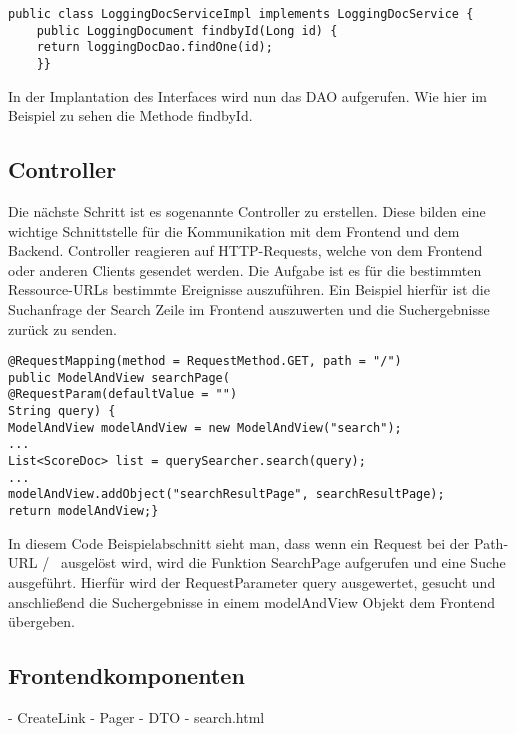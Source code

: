 \begin{lstlisting}
public class LoggingDocServiceImpl implements LoggingDocService {
	public LoggingDocument findbyId(Long id) {
	return loggingDocDao.findOne(id);
	}}
\end{lstlisting}

In der Implantation des Interfaces wird nun das DAO aufgerufen.
Wie hier im Beispiel zu sehen die Methode findbyId.

\subsection{Controller}
Die nächste Schritt ist es sogenannte Controller zu erstellen.
Diese bilden eine wichtige Schnittstelle für die Kommunikation mit dem Frontend und dem Backend.
Controller reagieren auf HTTP-Requests, welche von dem Frontend oder anderen Clients gesendet werden.
Die Aufgabe ist es für die bestimmten Ressource-URLs bestimmte Ereignisse auszuführen.
Ein Beispiel hierfür ist die Suchanfrage der Search Zeile im Frontend auszuwerten und die Suchergebnisse zurück zu senden.
\begin{lstlisting}
@RequestMapping(method = RequestMethod.GET, path = "/")
public ModelAndView searchPage(
@RequestParam(defaultValue = "")
String query) {
ModelAndView modelAndView = new ModelAndView("search");
...
List<ScoreDoc> list = querySearcher.search(query);
...
modelAndView.addObject("searchResultPage", searchResultPage);
return modelAndView;}
\end{lstlisting}

In diesem Code Beispielabschnitt sieht man, dass wenn ein Request bei der Path-URL \glqq/\grqq~ ausgelöst wird, wird die Funktion SearchPage aufgerufen und eine Suche ausgeführt.
Hierfür wird der RequestParameter query ausgewertet, gesucht und anschließend die Suchergebnisse in einem modelAndView Objekt dem Frontend übergeben. 

\subsection{Frontendkomponenten}

- CreateLink
- Pager
- DTO
- search.html







